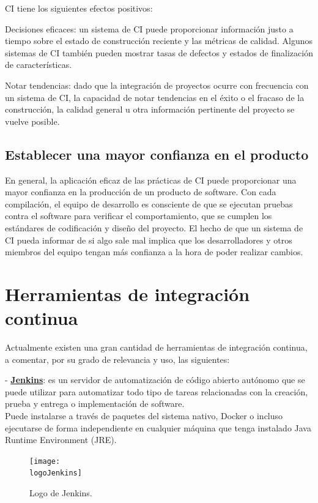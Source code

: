 CI tiene los siguientes efectos positivos:
\begin{compactitem}
    \item Decisiones eficaces: un sistema de CI puede proporcionar información justo a tiempo sobre el estado de construcción reciente y las métricas de calidad. Algunos sistemas de CI también pueden mostrar tasas de defectos y estados de finalización de características.
    \item Notar tendencias: dado que la integración de proyectos ocurre con frecuencia con un sistema de CI, la capacidad de notar tendencias en el éxito o el fracaso de la construcción, la calidad general u otra información pertinente del proyecto se vuelve posible.
\end{compactitem}
\subsection{Establecer una mayor confianza en el producto}
En general, la aplicación eficaz de las prácticas de CI puede proporcionar una mayor confianza en la producción de un producto de software. Con cada compilación, el equipo de desarrollo es consciente de que se ejecutan pruebas contra el software para verificar el comportamiento, que se cumplen los estándares de codificación y diseño del proyecto. El hecho de que un sistema de CI pueda informar de si algo sale mal implica que los desarrolladores y otros miembros del equipo tengan más confianza a la hora de poder realizar cambios.

\section{Herramientas de integración continua}
Actualmente existen una gran cantidad de herramientas de integración continua, a comentar, por su grado de relevancia y uso, las siguientes:

- \textbf{\underline{Jenkins}}: es un servidor de automatización de código abierto autónomo que se puede utilizar para automatizar todo tipo de tareas relacionadas con la creación, prueba y entrega o implementación de software.\\
Puede instalarse a través de paquetes del sistema nativo, Docker o incluso ejecutarse de forma independiente en cualquier máquina que tenga instalado Java Runtime Environment (JRE).
\begin{figure}[h]
    \centering
    \texttt{[image: \\logoJenkins]}
    \caption{Logo de Jenkins.}
\end{figure}

